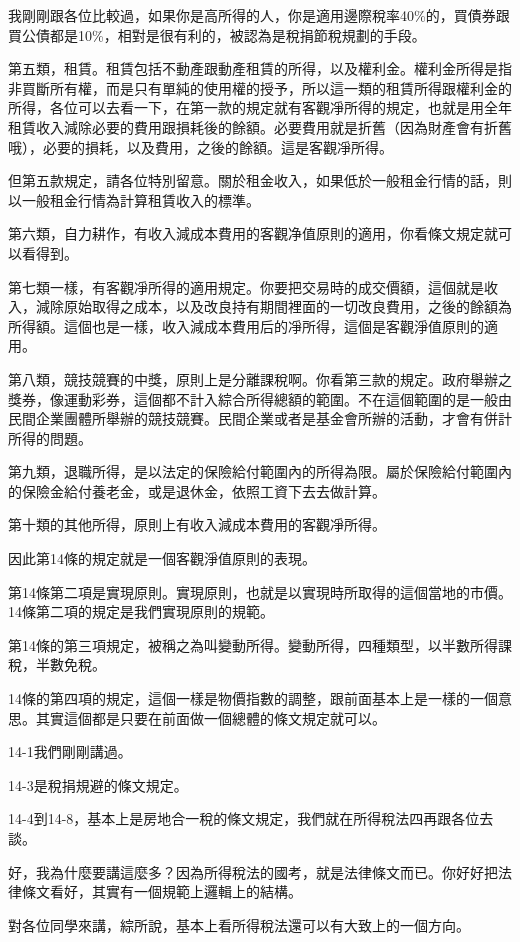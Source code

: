 \documentclass[oneside,sub3section]{ctexbook}
\begin{document}
我剛剛跟各位比較過，如果你是高所得的人，你是適用邊際稅率40\%的，買債券跟買公債都是10\%，相對是很有利的，被認為是稅捐節稅規劃的手段。

第五類，租賃。租賃包括不動產跟動產租賃的所得，以及權利金。權利金所得是指非買斷所有權，而是只有單純的使用權的授予，所以這一類的租賃所得跟權利金的所得，各位可以去看一下，在第一款的規定就有客觀凈所得的規定，也就是用全年租賃收入減除必要的費用跟損耗後的餘額。必要費用就是折舊（因為財產會有折舊哦），必要的損耗，以及費用，之後的餘額。這是客觀凈所得。

但第五款規定，請各位特別留意。關於租金收入，如果低於一般租金行情的話，則以一般租金行情為計算租賃收入的標準。

第六類，自力耕作，有收入減成本費用的客觀净值原則的適用，你看條文規定就可以看得到。

第七類一樣，有客觀凈所得的適用規定。你要把交易時的成交價額，這個就是收入，減除原始取得之成本，以及改良持有期間裡面的一切改良費用，之後的餘額為所得額。這個也是一樣，收入減成本費用后的凈所得，這個是客觀淨值原則的適用。

第八類，競技競賽的中獎，原則上是分離課稅啊。你看第三款的規定。政府舉辦之獎券，像運動彩券，這個都不計入綜合所得總額的範圍。不在這個範圍的是一般由民間企業團體所舉辦的競技競賽。民間企業或者是基金會所辦的活動，才會有併計所得的問題。

第九類，退職所得，是以法定的保險給付範圍內的所得為限。屬於保險給付範圍內的保險金給付養老金，或是退休金，依照工資下去去做計算。

第十類的其他所得，原則上有收入減成本費用的客觀凈所得。

因此第14條的規定就是一個客觀淨值原則的表現。

第14條第二項是實現原則。實現原則，也就是以實現時所取得的這個當地的市價。14條第二項的規定是我們實現原則的規範。

第14條的第三項規定，被稱之為叫變動所得。變動所得，四種類型，以半數所得課稅，半數免稅。

14條的第四項的規定，這個一樣是物價指數的調整，跟前面基本上是一樣的一個意思。其實這個都是只要在前面做一個總體的條文規定就可以。

14-1我們剛剛講過。

14-3是稅捐規避的條文規定。

14-4到14-8，基本上是房地合一稅的條文規定，我們就在所得稅法四再跟各位去談。

好，我為什麼要講這麼多？因為所得稅法的國考，就是法律條文而已。你好好把法律條文看好，其實有一個規範上邏輯上的結構。

對各位同學來講，綜所說，基本上看所得稅法還可以有大致上的一個方向。
\end{document}
